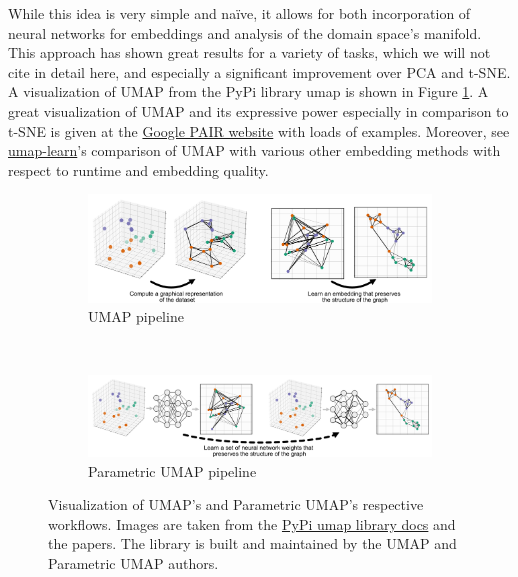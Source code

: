 \documentclass[]{article}
\begin{document}
While this idea is very simple and na\"ive, it allows for both incorporation of neural networks for embeddings and analysis of the domain space's manifold. This approach has shown great results for a variety of tasks, which we will not cite in detail here, and especially a significant improvement over PCA and t-SNE.
A visualization of UMAP from the PyPi library umap is shown in Figure \ref{fig:umap_vis}.
A great visualization of UMAP and its expressive power especially in comparison to t-SNE is given at the \href{https://pair-code.github.io/understanding-umap/}{Google PAIR website} with loads of examples. Moreover, see \href{https://umap-learn.readthedocs.io/en/latest/performance.html}{umap-learn}'s comparison of UMAP with various other embedding methods with respect to runtime and embedding quality.

\begin{figure}
	\centering
	\begin{subfigure}{1.\textwidth}
		\centering
		\includegraphics[width=.90\linewidth]{figures/umap-only.png}
		\caption{UMAP pipeline}
		\label{fig:umap_vis}
	\end{subfigure}\\
	\begin{subfigure}{1.\textwidth}
		\centering
		\includegraphics[width=0.90\linewidth]{figures/pumap-only.png}
		\caption{Parametric UMAP pipeline}
		\label{fig:para_umap_vis}
	\end{subfigure}
	
	\label{fig:umap_visualizations}
	\caption{Visualization of UMAP's and  Parametric UMAP's respective workflows. Images are taken from the \href{https://umap-learn.readthedocs.io/en/latest/parametric_umap.html}{PyPi umap library docs} and the papers. The library is built and maintained by the UMAP and Parametric UMAP authors.}
\end{figure}
\end{document}
